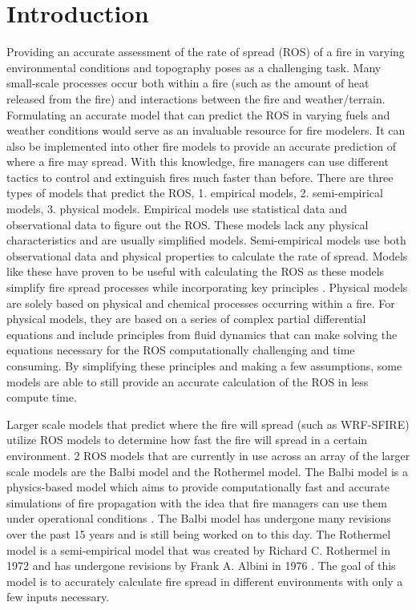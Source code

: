\documentclass{article}
\begin{document}
\section{Introduction}
Providing an accurate assessment of the rate of spread (ROS) of a fire in varying environmental conditions and topography poses as a challenging task. Many small-scale processes occur both within a fire (such as the amount of heat released from the fire) and interactions between the fire and weather/terrain. Formulating an accurate model that can predict the ROS in varying fuels and weather conditions would serve as an invaluable resource for fire modelers. It can also be implemented into other fire models to provide an accurate prediction of where a fire may spread. With this knowledge, fire managers can use different tactics to control and extinguish fires much faster than before. There are three types of models that predict the ROS, 1. empirical models, 2. semi-empirical models, 3. physical models. Empirical models use statistical data and observational data to figure out the ROS. These models lack any physical characteristics and are usually simplified models. Semi-empirical models use both observational data and physical properties to calculate the rate of spread. Models like these have proven to be useful with calculating the ROS as these models simplify fire spread processes while incorporating key principles \citep{Chatelon2022}. Physical models are solely based on physical and chemical processes occurring within a fire. For physical models, they are based on a series of complex partial differential equations and include principles from fluid dynamics that can make solving the equations necessary for the ROS computationally challenging and time consuming. By simplifying these principles and making a few assumptions, some models are able to still provide an accurate calculation of the ROS in less compute time.

Larger scale models that predict where the fire will spread (such as WRF-SFIRE) utilize ROS models to determine how fast the fire will spread in a certain environment. 2 ROS models that are currently in use across an array of the larger scale models are the Balbi model and the Rothermel model. The Balbi model is a physics-based model which aims to provide computationally fast and accurate simulations of fire propagation with the idea that fire managers can use them under operational conditions \citep{Chatelon2022}. The Balbi model has undergone many revisions over the past 15 years and is still being worked on to this day. The Rothermel model is a semi-empirical model that was created by Richard C. Rothermel in 1972 and has undergone revisions by Frank A. Albini in 1976 \citep{Anderson2010}. The goal of this model is to accurately calculate fire spread in different environments with only a few inputs necessary.
\end{document}
